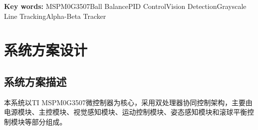 \documentclass[12pt,a4paper]{ctexart}
\begin{document}
\noindent
\textbf{Key words:} MSPM0G3507\hspace{1.5em}Ball Balance\hspace{1.5em}PID Control\hspace{1.5em}Vision Detection\hspace{1.5em}Grayscale Line Tracking\hspace{1.5em}Alpha-Beta Tracker

\newpage


\section{\textbf{系统方案设计}}

\subsection{\textbf{系统方案描述}}

本系统以TI MSPM0G3507微控制器为核心，采用双处理器协同控制架构，主要由电源模块、主控模块、视觉感知模块、运动控制模块、姿态感知模块和滚球平衡控制模块等部分组成。
\end{document}

